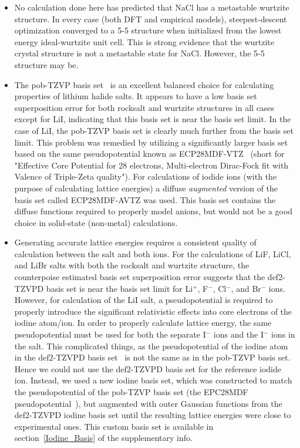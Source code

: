 \documentclass[preprint,aps,prb,floatfix]{revtex4-1}
\begin{document}
\begin{itemize}
	\item No calculation done here has predicted that NaCl has a metastable wurtzite structure. In every case (both DFT and empirical models), steepest-descent optimization converged to a 5-5 structure when initialized from the lowest energy ideal-wurtzite unit cell. This is strong evidence that the wurtzite crystal structure is not a metastable state for NaCl. However, the 5-5 structure may be.
	\item The pob-TZVP basis set~\cite{Peintinger2013,Laun2018} is an excellent balanced choice for calculating properties of lithium halide salts. It appears to have a low basis set superposition error for both rocksalt and wurtzite structures in all cases except for LiI, indicating that this basis set is near the basis set limit. In the case of LiI, the pob-TZVP basis set is clearly much further from the basis set limit. This problem was remedied by utilizing a significantly larger basis set based on the same pseudopotential known as ECP28MDF-VTZ~\cite{peterson2006spectroscopic} (short for "Effective Core Potential for 28 electrons, Multi-electron Dirac-Fock fit with Valence of Triple-Zeta quality"). For calculations of iodide ions (with the purpose of calculating lattice energies) a diffuse \textit{augmented} version of the basis set called ECP28MDF-AVTZ was used. This basis set contains the diffuse functions required to properly model anions, but would not be a good choice in solid-state (non-metal) calculations.
	\item Generating accurate lattice energies requires a consistent quality of calculation between the salt and both ions. For the calculations of LiF, LiCl, and LiBr salts with both the rocksalt and wurtzite structure, the counterpoise estimated basis set superposition error suggests that the def2-TZVPD basis set is near the basis set limit for Li$^{+}$, F$^{-}$, Cl$^{-}$, and Br$^{-}$ ions. However, for calculation of the LiI salt, a pseudopotential is required to properly introduce the significant relativistic effects into core electrons of the iodine atom/ion. In order to properly calculate lattice energy, the same pseudopotential must be used for both the separate I$^{-}$ ions and the I$^{-}$ ions in the salt. This complicated things, as the pseudopotential of the iodine atom in the def2-TZVPD basis set~\cite{Rappoport2010} is not the same as in the pob-TZVP basis set.~\cite{Laun2018} Hence we could not use the def2-TZVPD basis set for the reference iodide ion. Instead, we used a new iodine basis set, which was constructed to match the pseudopotential of the pob-TZVP basis set (the EPC28MDF pseudopotential~\cite{peterson2006spectroscopic}), but augmented with outer Gaussian functions from the def2-TZVPD iodine basis set until the resulting lattice energies were close to experimental ones. This custom basis set is available in section~\ref{Iodine_Basis} of the supplementary info.

\end{itemize}
\end{document}
